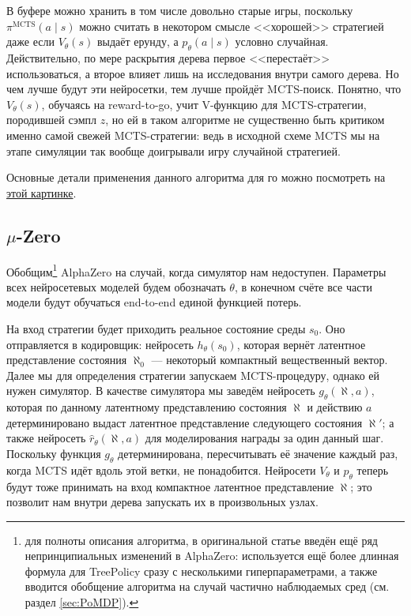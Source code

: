 В буфере можно хранить в том числе довольно старые игры, поскольку $\pi^{\mathrm{MCTS}}(a \mid s)$ можно считать в некотором смысле <<хорошей>> стратегией даже если $V_\theta(s)$ выдаёт ерунду, а $p_{\theta}(a \mid s)$ условно случайная. Действительно, по мере раскрытия дерева первое <<перестаёт>> использоваться, а второе влияет лишь на исследования внутри самого дерева. Но чем лучше будут эти нейросетки, тем лучше пройдёт MCTS-поиск. Понятно, что $V_{\theta}(s)$, обучаясь на reward-to-go, учит V-функцию для MCTS-стратегии, породившей сэмпл $z$, но ей в таком алгоритме не существенно быть критиком именно самой свежей MCTS-стратегии: ведь в исходной схеме MCTS мы на этапе симуляции так вообще доигрывали игру случайной стратегией.

\begin{example}
Основные детали применения данного алгоритма для го можно посмотреть на \href{https://miro.medium.com/max/2000/1*0pn33bETjYOimWjlqDLLNw.png}{этой картинке}.
\end{example}

\subsection{$\mu$-Zero}

Обобщим\footnote{для полноты описания алгоритма, в оригинальной статье введён ещё ряд непринципиальных изменений в AlphaZero: используется ещё более длинная формула для TreePolicy сразу с несколькими гиперпараметрами, а также вводится обобщение алгоритма на случай частично наблюдаемых сред (см. раздел \ref{sec:PoMDP}).} AlphaZero на случай, когда симулятор нам недоступен. Параметры всех нейросетевых моделей будем обозначать $\theta$, в конечном счёте все части модели будут обучаться end-to-end единой функцией потерь.

На вход стратегии будет приходить реальное состояние среды $s_0$. Оно отправляется в кодировщик: нейросеть $h_{\theta}(s_0)$, которая вернёт латентное представление состояния $\aleph_0$ --- некоторый компактный вещественный вектор. Далее мы для определения стратегии запускаем MCTS-процедуру, однако ей нужен симулятор. В качестве симулятора мы заведём нейросеть $g_{\theta}(\aleph, a)$, которая по данному латентному представлению состояния $\aleph$ и действию $a$ детерминировано выдаст латентное представление следующего состояния $\aleph'$; а также нейросеть $\hat{r}_{\theta}(\aleph, a)$ для моделирования награды за один данный шаг. Поскольку функция $g_{\theta}$ детерминирована, пересчитывать её значение каждый раз, когда MCTS идёт вдоль этой ветки, не понадобится. Нейросети $V_{\theta}$ и $p_{\theta}$ теперь будут тоже принимать на вход компактное латентное представление $\aleph$; это позволит нам внутри дерева запускать их в произвольных узлах.

